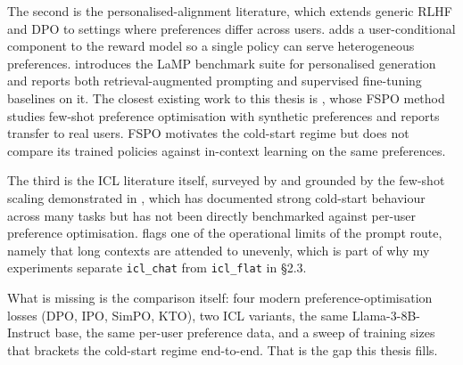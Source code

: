 The second is the personalised-alignment literature, which extends generic RLHF and DPO to settings where preferences differ across users. \citet{li2024prlhf} adds a user-conditional component to the reward model so a single policy can serve heterogeneous preferences. \citet{salemi2024lamp} introduces the LaMP benchmark suite for personalised generation and reports both retrieval-augmented prompting and supervised fine-tuning baselines on it. The closest existing work to this thesis is \citet{singh2025fspo}, whose FSPO method studies few-shot preference optimisation with synthetic preferences and reports transfer to real users. FSPO motivates the cold-start regime but does not compare its trained policies against in-context learning on the same preferences.

The third is the ICL literature itself, surveyed by \citet{dong2024iclsurvey} and grounded by the few-shot scaling demonstrated in \citet{brown2020gpt3}, which has documented strong cold-start behaviour across many tasks but has not been directly benchmarked against per-user preference optimisation. \citet{liu2023lostmiddle} flags one of the operational limits of the prompt route, namely that long contexts are attended to unevenly, which is part of why my experiments separate \texttt{icl\_chat} from \texttt{icl\_flat} in §2.3.

What is missing is the comparison itself: four modern preference-optimisation losses (DPO, IPO, SimPO, KTO), two ICL variants, the same Llama-3-8B-Instruct base, the same per-user preference data, and a sweep of training sizes that brackets the cold-start regime end-to-end. That is the gap this thesis fills.